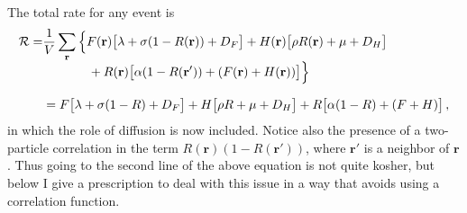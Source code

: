 \documentclass[11pt]{iopart}
\begin{document}
The total rate for any event is
\begin{align}
\label{R}
\mathcal{R}=&\frac{1}{V}\sum_{\mathbf{r}}\Big\{F(\mathbf{r})\big[\lambda
  +\sigma(1-R(\mathbf{r}))+D_F\big]
+ H(\mathbf{r})\big[\rho R(\mathbf{r})+\mu+D_H\big]\Big.\nonumber \\[-0.05in]
&\Big.\hskip 0.5in
  +R(\mathbf{r})\big[\alpha(1-R(\mathbf{r'}))+(F(\mathbf{r})+H(\mathbf{r}))\big]\Big\}\,\nonumber
  \\[0.1in]
&=F\big[\lambda +\sigma(1-R)+D_F\big]
+ H\big[\rho R+\mu+D_H\big]+R\big[\alpha(1-R)+(F+H)\big]\,,
\end{align}
in which the role of diffusion is now included.  Notice also the presence of
a two-particle correlation in the term $R(\mathbf{r})(1-R(\mathbf{r}'))$,
where $\mathbf{r'}$ is a neighbor of $\mathbf{r}$.  Thus going to the second
line of the above equation is not quite kosher, but below I give a
prescription to deal with this issue in a way that avoids using a correlation
function.
\end{document}
